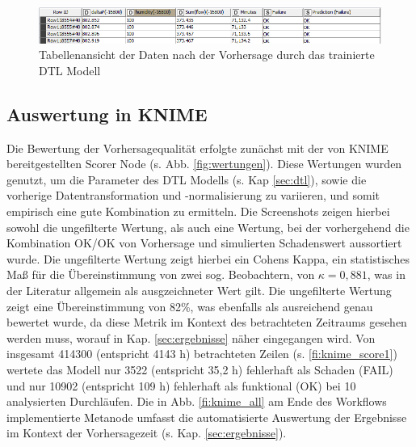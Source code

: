     \begin{figure}[H]
        \begin{center}
            \includegraphics[width=\linewidth]{images/knime_table.png}
            \caption[KNIME Vorhersagetabelle]{Tabellenansicht der Daten nach der Vorhersage durch das trainierte DTL Modell}
            \label{fi:knime_table}
        \end{center}
    \end{figure}
    \subsection{Auswertung in KNIME}
    \label{sec:knime_auswertung}
    Die Bewertung der Vorhersagequalität erfolgte zunächst mit der von KNIME bereitgestellten Scorer Node (s. Abb. \ref{fig:wertungen}). Diese Wertungen wurden genutzt, um die Parameter des \ac{DTL} Modells (s. Kap \ref{sec:dtl}), sowie die vorherige Datentransformation und -normalisierung zu variieren, und somit empirisch eine gute Kombination zu ermitteln. Die Screenshots zeigen hierbei sowohl die ungefilterte Wertung, als auch eine Wertung, bei der vorhergehend die Kombination OK/OK von Vorhersage und simulierten Schadenswert aussortiert wurde. 
    Die ungefilterte Wertung zeigt hierbei ein Cohens Kappa, ein statistisches Maß für die Übereinstimmung von zwei sog. Beobachtern, von $\kappa  = 0,881$, was in der Literatur allgemein als ausgzeichneter Wert gilt. Die ungefilterte Wertung zeigt eine Übereinstimmung von 82\%, was ebenfalls als ausreichend genau bewertet wurde, da diese Metrik im Kontext des betrachteten Zeitraums gesehen werden muss, worauf in Kap. \ref{sec:ergebnisse} näher eingegangen wird. Von insgesamt 414300 (entspricht 4143 h)  betrachteten Zeilen (s. \ref{fi:knime_score1}) wertete das Modell nur 3522 (entspricht 35,2 h) fehlerhaft als Schaden (FAIL) und nur 10902 (entspricht 109 h)  fehlerhaft als funktional (OK) bei 10 analysierten Durchläufen.
    Die in Abb. \ref{fi:knime_all} am Ende des Workflows implementierte Metanode umfasst die automatisierte Auswertung der Ergebnisse im Kontext der Vorhersagezeit (s. Kap. \ref{sec:ergebnisse}). 
